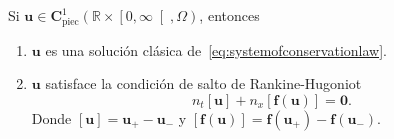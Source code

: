 \begin{theorem}
	Si
	\begin{math}
		\symbf{u}\in
		\symbf{C}^{1}_{\text{piec}}
		\left(\mathbb{R}\times\left[0,\infty\right[,\Omega\right)
	\end{math},
	entonces
	\begin{enumerate}%
		\item

		      $\symbf{u}$ es una solución clásica
		      de~\eqref{eq:systemofconservationlaw}.

		\item

		      $\symbf{u}$ satisface la condición de salto de
		      Rankine-Hugoniot
		      \begin{equation*}
			      n_{t}
			      \left[\symbf{u}\right]+
			      n_{x}
			      \left[\symbf{f}\left(\symbf{u}\right)\right]=
			      \symbf{0}.
		      \end{equation*}
		      Donde
		      $\left[\symbf{u}\right]=\symbf{u}_{+}-\symbf{u}_{-}$ y
		      \begin{math}
			      \left[\symbf{f}\left(\symbf{u}\right)\right]=
			      \symbf{f}\left(\symbf{u}_{+}\right)-
			      \symbf{f}\left(\symbf{u}_{-}\right)
		      \end{math}.
	\end{enumerate}
\end{theorem}

